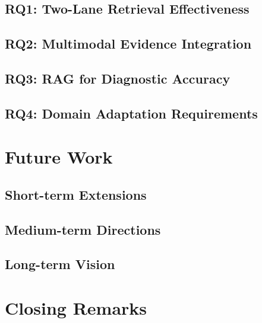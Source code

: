 \subsection{RQ1: Two-Lane Retrieval Effectiveness}
\label{subsec:conclusion:answers:rq1}

\subsection{RQ2: Multimodal Evidence Integration}
\label{subsec:conclusion:answers:rq2}

\subsection{RQ3: RAG for Diagnostic Accuracy}
\label{subsec:conclusion:answers:rq3}

\subsection{RQ4: Domain Adaptation Requirements}
\label{subsec:conclusion:answers:rq4}

%
%
\section{Future Work}
\label{sec:conclusion:future}

\subsection{Short-term Extensions}
\label{subsec:conclusion:future:shortterm}

\subsection{Medium-term Directions}
\label{subsec:conclusion:future:mediumterm}

\subsection{Long-term Vision}
\label{subsec:conclusion:future:longterm}

%
%
\section{Closing Remarks}
\label{sec:conclusion:closing}
